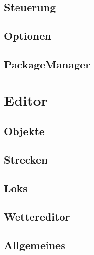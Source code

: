 \documentclass[11pt, a4paper]{refrep}
\begin{document}
\chapter{Steuerung}

\chapter{Optionen}

\chapter{PackageManager}


\part{Editor}
\chapter{Objekte}






\chapter{Strecken}


			
\chapter{Loks}





\chapter{Wettereditor}


\chapter{Allgemeines}



\end{document}
